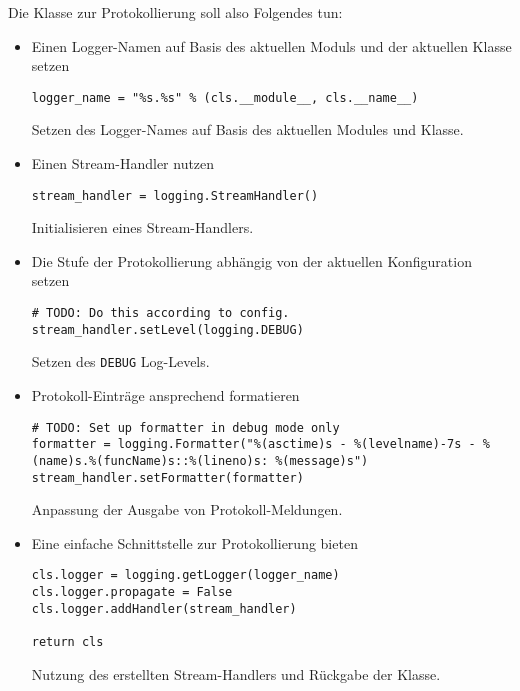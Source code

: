 \documentclass[10pt, openright, notitlepage]{scrreprt}
\begin{document}
Die Klasse zur Protokollierung soll also Folgendes tun:

\begin{itemize}
\item Einen Logger-Namen auf Basis des aktuellen Moduls und der aktuellen Klasse setzen
\begin{listing}[H]
\begin{verbatim}
logger_name = "%s.%s" % (cls.__module__, cls.__name__)
\end{verbatim}
\caption{\label{org16a7d85}
Setzen des Logger-Names auf Basis des aktuellen Modules und Klasse.}
\end{listing}

\item Einen Stream-Handler nutzen
\begin{listing}[H]
\begin{verbatim}
stream_handler = logging.StreamHandler()
\end{verbatim}
\caption{\label{org701ba1e}
Initialisieren eines Stream-Handlers.}
\end{listing}

\item Die Stufe der Protokollierung abhängig von der aktuellen Konfiguration setzen
\begin{listing}[H]
\begin{verbatim}
# TODO: Do this according to config.
stream_handler.setLevel(logging.DEBUG)
\end{verbatim}
\caption{\label{orgffe05ce}
Setzen des \texttt{DEBUG} Log-Levels.}
\end{listing}

\item Protokoll-Einträge ansprechend formatieren
\begin{listing}[H]
\begin{verbatim}
# TODO: Set up formatter in debug mode only
formatter = logging.Formatter("%(asctime)s - %(levelname)-7s - %(name)s.%(funcName)s::%(lineno)s: %(message)s")
stream_handler.setFormatter(formatter)
\end{verbatim}
\caption{\label{orgd93397b}
Anpassung der Ausgabe von Protokoll-Meldungen.}
\end{listing}

\item Eine einfache Schnittstelle zur Protokollierung bieten
\begin{listing}[H]
\begin{verbatim}
cls.logger = logging.getLogger(logger_name)
cls.logger.propagate = False
cls.logger.addHandler(stream_handler)

return cls
\end{verbatim}
\caption{\label{org0515601}
Nutzung des erstellten Stream-Handlers und Rückgabe der Klasse.}
\end{listing}
\end{itemize}
\end{document}
